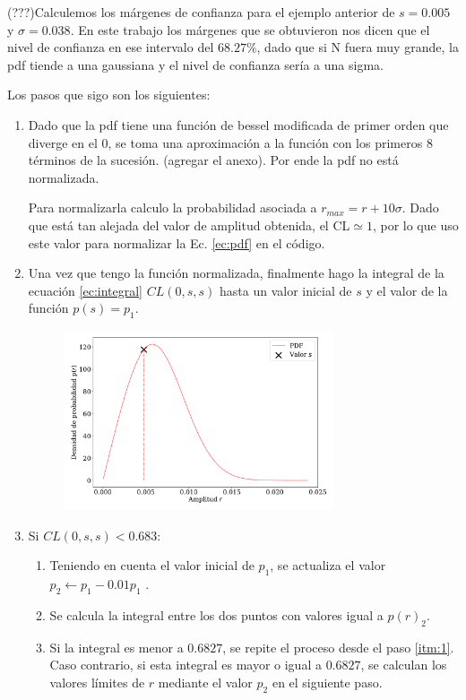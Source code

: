 (???)Calculemos los márgenes de confianza para el ejemplo anterior de $s=0.005$ y $\sigma=0.038$. En este trabajo los márgenes que se obtuvieron nos dicen que el nivel de confianza en ese intervalo del $68.27\%$, dado que si N fuera muy grande, la pdf tiende a una gaussiana y el nivel de confianza sería a una sigma.


Los pasos que sigo son los siguientes: 

\begin{enumerate}
    \item 
    Dado que la pdf tiene una función de bessel modificada de primer orden que diverge en el 0, se toma una aproximación a la función con los primeros 8 términos de la sucesión. (agregar el anexo). Por ende la pdf no está normalizada. 
    
    Para normalizarla calculo la probabilidad asociada a $r_{max}=r +  10\sigma$. Dado que está tan alejada del valor de amplitud obtenida, el CL$\simeq 1$, por lo que uso este valor para normalizar  la Ec. \ref{ec:pdf} en el código.
    \item Una vez que tengo la función normalizada, finalmente hago la integral de la ecuación \ref{ec:integral} $CL(0,s,s)$ hasta un valor inicial de $s$ y el valor de la función $p(s)=p_1$.
    \begin{figure}[H]
        \begin{small}
            \begin{center}
                \includegraphics[width=0.75\textwidth]{bessel_prob_value_s_v2.pdf}
            \end{center}
            \caption{}
        \end{small}
    \end{figure}
    \item Si $CL(0,s,s)< 0.683$:
    \begin{enumerate}
        \item Teniendo en cuenta el valor inicial de $p_1$, se actualiza el valor  $p_2 \leftarrow p_1 - 0.01 p_1$ \label{itm:1}.
        \item Se calcula la integral entre los dos puntos con valores igual a $p(r)_2$. 
        \item \label{itm:3} Si la integral es menor a $0.6827$, se repite el proceso desde el paso \ref{itm:1}. Caso contrario, si esta integral es mayor o igual a $0.6827$, se calculan los valores límites de $r$ mediante el valor $p_2$ en el siguiente paso. 


\end{enumerate}
\end{enumerate}
